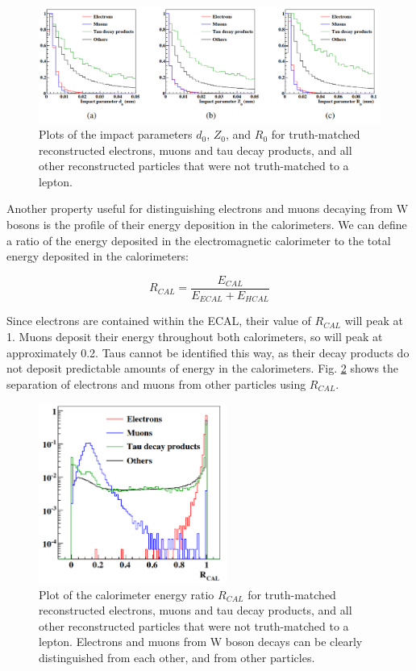 \begin{figure}[p]
	\centering
	\includegraphics[width=1.0\textwidth]{../Pictures/Analysis/impact-parameter.png}
	\caption{Plots of the impact parameters $d_0$, $Z_0$, and $R_0$ for truth-matched reconstructed electrons, muons and tau decay products, and all other reconstructed particles that were not truth-matched to a lepton.}
	\label{figure:analysis/leptons/impact-parameter}
\end{figure}

Another property useful for distinguishing electrons and muons decaying from W bosons is the profile of their energy deposition in the calorimeters. We can define a ratio of the energy deposited in the electromagnetic calorimeter to the total energy deposited in the calorimeters:

\begin{equation}
	R_{CAL} = \frac{E_{CAL}}{E_{ECAL} + E_{HCAL}}
\label{eq:calorimeter-ratio}
\end{equation}

Since electrons are contained within the \acrshort{ECAL}, their value of $R_{CAL}$ will peak at 1. Muons deposit their energy throughout both calorimeters, so will peak at approximately 0.2. Taus cannot be identified this way, as their decay products do not deposit predictable amounts of energy in the calorimeters. Fig. \ref{figure:analysis/leptons/cal-energy} shows the separation of electrons and muons from other particles using $R_{CAL}$.

\begin{figure}[p]
	\centering
	\includegraphics[width=0.55\textwidth]{../Pictures/Analysis/cal-energy.png}
	\caption{Plot of the calorimeter energy ratio $R_{CAL}$ for truth-matched reconstructed electrons, muons and tau decay products, and all other reconstructed particles that were not truth-matched to a lepton. Electrons and muons from W boson decays can be clearly distinguished from each other, and from  other particles.}
	\label{figure:analysis/leptons/cal-energy}
\end{figure}

